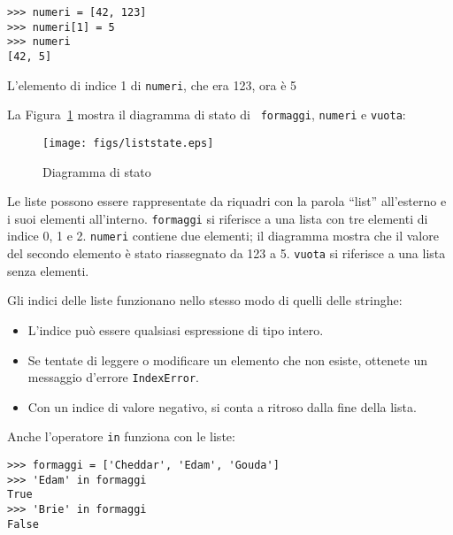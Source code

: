 \documentclass[10pt]{book}
\begin{document}
\begin{verbatim}
>>> numeri = [42, 123]
>>> numeri[1] = 5
>>> numeri
[42, 5]
\end{verbatim}
%
L'elemento di indice 1 di {\tt numeri}, che era 123, ora è 5

La Figura~\ref{fig.liststate} mostra il diagramma di stato di {\tt
formaggi}, {\tt numeri} e {\tt vuota}:


\begin{figure}
\centerline
{\texttt{[image: figs/liststate.eps]}}
\caption{Diagramma di stato}
\label{fig.liststate}
\end{figure}

Le liste possono essere rappresentate da riquadri con la parola ``list'' all'esterno e i suoi elementi all'interno.  {\tt formaggi} si riferisce a una lista con tre elementi di indice 0, 1 e 2.
{\tt numeri} contiene due elementi; il diagramma mostra che il valore del secondo elemento è stato riassegnato da 123 a 5. {\tt vuota} si riferisce a una lista senza elementi.

Gli indici delle liste funzionano nello stesso modo di quelli delle stringhe:

\begin{itemize}

\item L'indice può essere qualsiasi espressione di tipo intero.

\item Se tentate di leggere o modificare un elemento che non esiste, ottenete un messaggio d'errore {\tt IndexError}.

\item Con un indice di valore negativo, si conta a ritroso dalla fine della
   lista.

\end{itemize}

Anche l'operatore {\tt in} funziona con le liste:

\begin{verbatim}
>>> formaggi = ['Cheddar', 'Edam', 'Gouda']
>>> 'Edam' in formaggi
True
>>> 'Brie' in formaggi
False
\end{verbatim}
\end{document}
